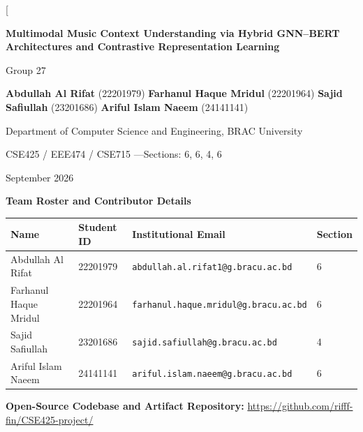 \documentclass[10pt,twocolumn]{article}
\begin{document}
\twocolumn[
\begin{center}
{\LARGE\bfseries Multimodal Music Context Understanding via Hybrid GNN--BERT Architectures and Contrastive Representation Learning\par}
\vspace{0.7em}
{\large Group 27\par}
\vspace{0.4em}
{\normalsize
\textbf{Abdullah Al Rifat} (22201979)\quad
\textbf{Farhanul Haque Mridul} (22201964)\quad
\textbf{Sajid Safiullah} (23201686)\quad
\textbf{Ariful Islam Naeem} (24141141)\par}
\vspace{0.3em}
{\normalsize Department of Computer Science and Engineering, BRAC University\par}
{\normalsize CSE425 / EEE474 / CSE715 \quad---\quad Sections: 6, 6, 4, 6\par}
{\normalsize September 2026\par}
\end{center}

\vspace{1.0em}
\begin{center}
{\normalsize\bfseries Team Roster and Contributor Details\par}
\end{center}
\vspace{0.3em}
\begin{minipage}{\textwidth}
\centering
\small
\begin{tabular}{llll}
\toprule
\textbf{Name} & \textbf{Student ID} & \textbf{Institutional Email} & \textbf{Section}\\
\midrule
Abdullah Al Rifat & 22201979 & \texttt{abdullah.al.rifat1@g.bracu.ac.bd} & 6\\
Farhanul Haque Mridul & 22201964 & \texttt{farhanul.haque.mridul@g.bracu.ac.bd} & 6\\
Sajid Safiullah & 23201686 & \texttt{sajid.safiullah@g.bracu.ac.bd} & 4\\
Ariful Islam Naeem & 24141141 & \texttt{ariful.islam.naeem@g.bracu.ac.bd} & 6\\
\bottomrule
\end{tabular}
\end{minipage}

\vspace{0.8em}
\noindent\textbf{Open-Source Codebase and Artifact Repository:} \url{https://github.com/rifff-fin/CSE425-project/}
\end{document}
